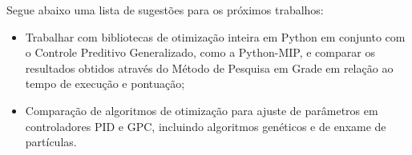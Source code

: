\documentclass[12pt,           %
a4paper,                       %
openany,                       %
oneside,                       %
chapter=TITLE,                 %
english,                       %
spanish,                       %
brazil,                        %
sumario=tradicional]{abntex2}  %
\begin{document}
\begin{OnehalfSpace}
Segue abaixo uma lista de sugestões para os próximos trabalhos:

\begin{itemize}
\item Trabalhar com bibliotecas de otimização inteira em Python em conjunto com o Controle Preditivo Generalizado, como a Python-MIP, e comparar os resultados obtidos através do Método de Pesquisa em Grade em relação ao tempo de execução e pontuação;
\item Comparação de algoritmos de otimização para ajuste de parâmetros em controladores PID e GPC, incluindo algoritmos genéticos e de enxame de partículas.
\end{itemize}


			
		
\end{OnehalfSpace}                          %
\label{lastpage}
\end{document}
